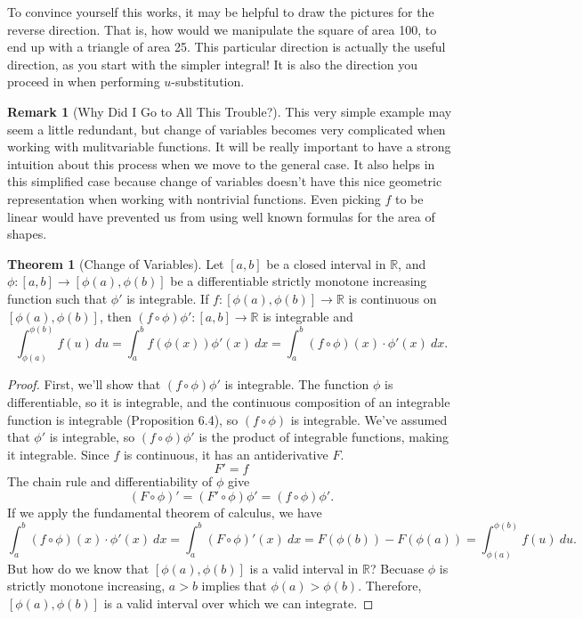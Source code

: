 \documentclass{article}
\newcommand{\R}{\mathbb{R}}
\theoremstyle{definition}
\newtheorem{theorem}{Theorem}[section]
\newtheorem{remark}{Remark}[section]
\begin{document}
	To convince yourself this works, it may be helpful to draw the pictures for the reverse direction. That is, how would we manipulate the square of area 100, to end up with a triangle of area 25. This particular direction is actually the useful direction, as you start with the simpler integral! It is also the direction you proceed in when performing $ u $-substitution. 
	\begin{remark}[Why Did I Go to All This Trouble?]
		This very simple example may seem a little redundant, but change of variables becomes very complicated when working with mulitvariable functions. It will be really important to have a strong intuition about this process when we move to the general case. It also helps in this simplified case because change of variables doesn't have this nice geometric representation when working with nontrivial functions. Even picking $ f $ to be linear would have prevented us from using well known formulas for the area of shapes. 
	\end{remark}
	\begin{theorem}[Change of Variables]
		Let $[a,b]$ be a closed interval in $\R$, and $\phi:[a,b]\to [\phi(a),\phi(b)]$ be a differentiable strictly monotone increasing function such that $\phi'$ is integrable. If $f:[\phi(a),\phi(b)]\to \R$ is continuous on $[\phi(a),\phi(b)]$, then $(f\circ\phi)\phi':[a,b]\to \R$ is integrable and 
		$$ \int_{\phi(a)}^{\phi(b)} f(u)\ du = \int_a^b f(\phi(x))\phi'(x)\ dx =  \int_a^b (f\circ \phi)(x)\cdot \phi'(x)\ dx.$$
	\end{theorem}
	\begin{proof}
		First, we'll show that $(f\circ\phi)\phi'$ is integrable. The function $\phi$ is differentiable, so it is integrable, and the continuous composition of an integrable function is integrable (Proposition 6.4), so $(f\circ\phi)$ is integrable. We've assumed that $\phi'$ is integrable, so $(f\circ\phi)\phi'$ is the product of integrable functions, making it integrable. Since $f$ is continuous, it has an antiderivative $F$.
		$$ F' = f$$
		The chain rule and differentiability of $\phi$ give
		$$ (F\circ \phi)' = (F'\circ \phi)\phi' = (f\circ\phi)\phi'.$$ If we apply the fundamental theorem of calculus, we have 
		$$ \int_{a}^b(f\circ\phi)(x)\cdot\phi'(x)\ dx = \int_a^b (F\circ \phi)' (x)\ dx = F(\phi(b)) - F(\phi(a)) = \int_{\phi(a)}^{\phi(b)}f(u)\ du.$$
		But how do we know that $[\phi(a), \phi(b)]$ is a valid interval in $\R$? Becuase $\phi$ is strictly monotone increasing, $a > b$ implies that $\phi(a) > \phi(b)$. Therefore, $[\phi(a),\phi(b)]$ is a valid interval over which we can integrate. 
	\end{proof}
\end{document}
